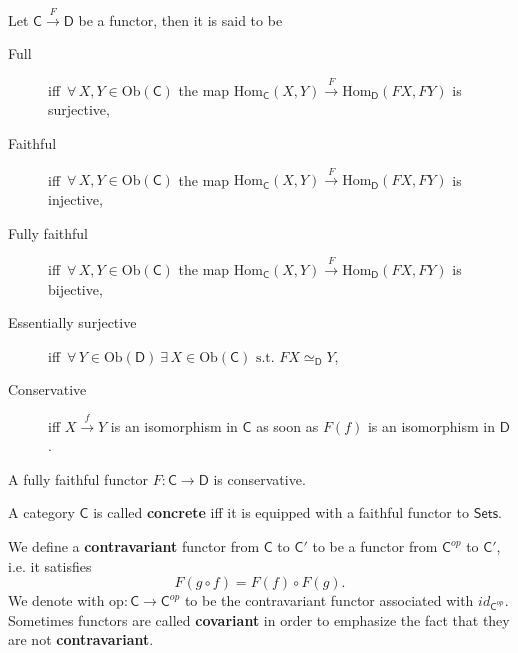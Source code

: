 \begin{defn}
	Let $\mathsf{C} \xrightarrow{F} \mathsf{D}$ be a functor, then it is said to be
	\begin{description}
		\item[Full] iff $\,\forall\, X,Y \in \mathrm{Ob} \left(\mathsf{C}\right)$ the map $\mathrm{Hom}_{\mathsf{C}} \left( X, Y \right) \xrightarrow{F} \mathrm{Hom}_{\mathsf{D}} \left( FX, FY \right)$ is surjective,
		\item[Faithful] iff $\,\forall\, X,Y \in \mathrm{Ob} \left(\mathsf{C}\right)$ the map $\mathrm{Hom}_{\mathsf{C}} \left( X, Y \right) \xrightarrow{F} \mathrm{Hom}_{\mathsf{D}} \left( FX, FY \right)$ is injective,
		\item[Fully faithful] iff $\,\forall\, X,Y \in \mathrm{Ob} \left(\mathsf{C}\right)$ the map $\mathrm{Hom}_{\mathsf{C}} \left( X, Y \right) \xrightarrow{F} \mathrm{Hom}_{\mathsf{D}} \left( FX, FY \right)$ is bijective,
		\item[Essentially surjective] iff $\,\forall\, Y \in \mathrm{Ob} \left(\mathsf{D}\right)\ \exists\, X \in \mathrm{Ob} \left(\mathsf{C}\right) \text{ s.t. } FX \simeq_{\mathsf{D}} Y$,
		\item[Conservative] iff $X \xrightarrow{f} Y$ is an isomorphism in $\mathsf{C}$ as soon as $F(f)$ is an isomorphism in $\mathsf{D}$.
	\end{description} 
\end{defn}

\begin{rem}
	A fully faithful functor $F: \mathsf{C} \to \mathsf{D}$ is conservative.
\end{rem}


\begin{defn}
	A category $\mathsf{C}$ is called \textbf{concrete} iff it is equipped with a faithful functor to $\mathsf{Sets}$.
\end{defn}


\begin{defn}
	We define a \textbf{contravariant} functor from $\mathsf{C}$ to $\mathsf{C}'$ to be a functor from $\mathsf{C}^{op}$ to $\mathsf{C}'$, i.e. it satisfies
	\begin{equation}
		F(g \circ f) = F(f) \circ F(g)
	.\end{equation}
	We denote with $\mathrm{op}: \mathsf{C} \to \mathsf{C}^{op}$ to be the contravariant functor associated with $id_{\mathsf{C}^{op}}$.
	Sometimes functors are called \textbf{covariant} in order to emphasize the fact that they are not \textbf{contravariant}.
\end{defn}

